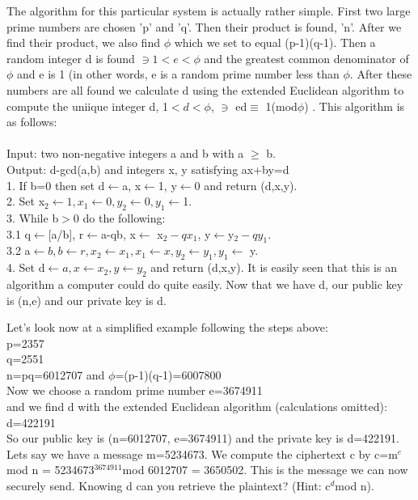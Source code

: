 \documentclass[12pt]{report}
\begin{document}
The algorithm for this particular system is actually rather simple.  First two large prime numbers are chosen 'p' and 'q'.  Then their product is found, 'n'.  After we find their product, we also find $\phi$ which we set to equal (p-1)(q-1).  Then a random integer d is found $\ni 1 < e < \phi$ and the greatest common denominator of $\phi$ and e is 1 (in other words, e is a random prime number less than $\phi$.  After these numbers are all found we calculate d using the extended Euclidean algorithm to compute the uniique integer d, 1$<d<\phi$, $\ni$ ed$\equiv$ 1(mod$\phi$) \cite[page286]{Menezes}.  This algorithm is as follows:\\
\\
\noindent Input:  two non-negative integers a and b with a $\geq$ b.\\
Output:  d-gcd(a,b) and integers x, y satisfying ax+by=d\\
1.  If b=0 then set d$\leftarrow$a, x$\leftarrow$1, y$\leftarrow$0 and return (d,x,y).\\
2.  Set x$_{2}\leftarrow1, x_{1}\leftarrow0, y_{2}\leftarrow0, y_{1}\leftarrow$1.\\
3.  While b$>$0 do the following:\\
3.1  q$\leftarrow$[a/b], r$\leftarrow$a-qb, x$\leftarrow$ x$_{2}-qx_{1}$, y$\leftarrow$y$_{2}-qy_{1}$.\\
3.2  a$\leftarrow b, b\leftarrow r, x_{2}\leftarrow x_{1}, x_{1}\leftarrow x, y_{2}\leftarrow y_{1}, y_{1}\leftarrow$ y.\\
4.  Set d$\leftarrow a, x\leftarrow x_{2}, y\leftarrow y_{2}$ and return (d,x,y).\cite[page 67]{Menezes}
It is easily seen that this is an algorithm a computer could do quite easily.  Now that we have d, our public key is (n,e) and our private key is d.

\noindent Let's look now at a simplified example following the steps above:\\
p=2357\\
q=2551\\
n=pq=6012707
and $\phi$=(p-1)(q-1)=6007800\\
Now we choose a random prime number e=3674911\\
and we find d with the extended Euclidean algorithm (calculations omitted):  d=422191\cite[287]{Menezes}\\

\noindent So our public key is (n=6012707, e=3674911) and the private key is d=422191.  Lets say we have a message m=5234673.  We compute the ciphertext c by c=m$^{e}$mod n = 5234673$^{3674911}$mod 6012707 = 3650502.  This is the message we can now securely send.  Knowing d can you retrieve the plaintext? (Hint: c$^{d}$mod n).
\end{document}
